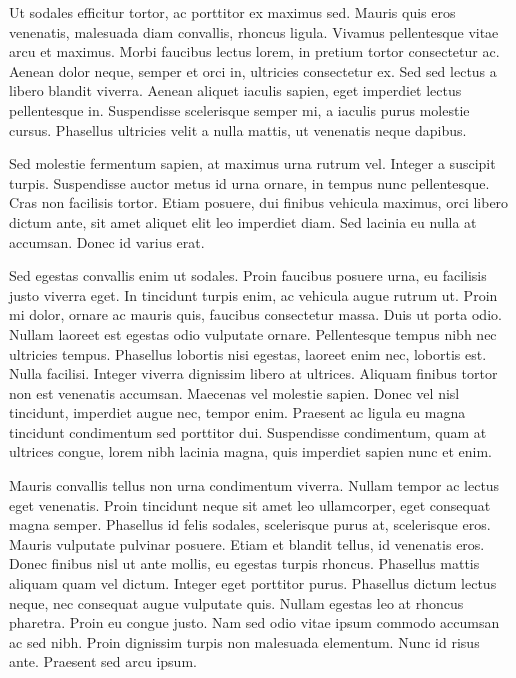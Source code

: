 \documentclass[12pt,a4paper]{article}%
\begin{document}
%
\begin{justify}%
%
\end{justify}%
\begin{justify}%
Ut sodales efficitur tortor, ac porttitor ex maximus sed. Mauris quis eros venenatis, malesuada diam convallis, rhoncus ligula. Vivamus pellentesque vitae arcu et maximus. Morbi faucibus lectus lorem, in pretium tortor consectetur ac. Aenean dolor neque, semper et orci in, ultricies consectetur ex. Sed sed lectus a libero blandit viverra. Aenean aliquet iaculis sapien, eget imperdiet lectus pellentesque in. Suspendisse scelerisque semper mi, a iaculis purus molestie cursus. Phasellus ultricies velit a nulla mattis, ut venenatis neque dapibus.%
\end{justify}%
\begin{justify}%
Sed molestie fermentum sapien, at maximus urna rutrum vel. Integer a suscipit turpis. Suspendisse auctor metus id urna ornare, in tempus nunc pellentesque. Cras non facilisis tortor. Etiam posuere, dui finibus vehicula maximus, orci libero dictum ante, sit amet aliquet elit leo imperdiet diam. Sed lacinia eu nulla at accumsan. Donec id varius erat.%
\end{justify}%
\begin{justify}%
Sed egestas convallis enim ut sodales. Proin faucibus posuere urna, eu facilisis justo viverra eget. In tincidunt turpis enim, ac vehicula augue rutrum ut. Proin mi dolor, ornare ac mauris quis, faucibus consectetur massa. Duis ut porta odio. Nullam laoreet est egestas odio vulputate ornare. Pellentesque tempus nibh nec ultricies tempus. Phasellus lobortis nisi egestas, laoreet enim nec, lobortis est. Nulla facilisi. Integer viverra dignissim libero at ultrices. Aliquam finibus tortor non est venenatis accumsan. Maecenas vel molestie sapien. Donec vel nisl tincidunt, imperdiet augue nec, tempor enim. Praesent ac ligula eu magna tincidunt condimentum sed porttitor dui. Suspendisse condimentum, quam at ultrices congue, lorem nibh lacinia magna, quis imperdiet sapien nunc et enim.%
\end{justify}%
\begin{justify}%
Mauris convallis tellus non urna condimentum viverra. Nullam tempor ac lectus eget venenatis. Proin tincidunt neque sit amet leo ullamcorper, eget consequat magna semper. Phasellus id felis sodales, scelerisque purus at, scelerisque eros. Mauris vulputate pulvinar posuere. Etiam et blandit tellus, id venenatis eros. Donec finibus nisl ut ante mollis, eu egestas turpis rhoncus. Phasellus mattis aliquam quam vel dictum. Integer eget porttitor purus. Phasellus dictum lectus neque, nec consequat augue vulputate quis. Nullam egestas leo at rhoncus pharetra. Proin eu congue justo. Nam sed odio vitae ipsum commodo accumsan ac sed nibh. Proin dignissim turpis non malesuada elementum. Nunc id risus ante. Praesent sed arcu ipsum.%
\end{justify}%
\end{document}
